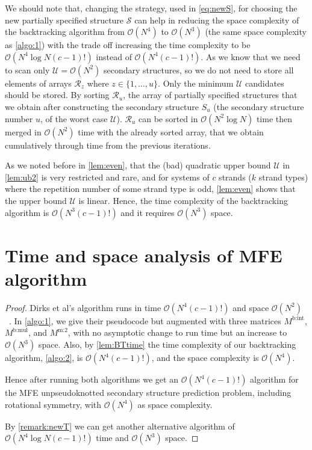 \begin{remark}\label{remark:newT}
	We should note that, changing the strategy, used in \cref{eq:newS}, for choosing the new partially specified structure $\mathcal{S}$ can help in reducing the space complexity of the backtracking algorithm from $\mathcal{O}(N^4)$ to $\mathcal{O}(N^3)$ (the same space complexity as \snMFE \cref{algo:1}) with the trade off increasing the time complexity to be $\mathcal{O}(N^4 \log N(c-1)!)$ instead of $\mathcal{O}(N^4 (c-1)!)$. As we know that we need to scan only $\mathcal{U} = \mathcal{O}(N^2)$ secondary structures, so we do not need to store all elements of arrays $\mathcal{R}_z$ where $z \in \{1,\ldots,u\}$. 
	Only the minimum $\mathcal{U}$ candidates should be stored. By sorting $\mathcal{R}_u$, the array of partially specified structures that we obtain after constructing the secondary structure $S_u$ (the secondary structure number $u$, of the worst case $\mathcal{U}$). $\mathcal{R}_u$ can be sorted in $\mathcal{O}(N^2 \log N)$ time then merged in $\mathcal{O}(N^2)$ time with the already sorted array, that we obtain cumulatively through time from the previous iterations.        
\end{remark} 

As we noted before in \cref{lem:even}, that the (bad) quadratic upper bound $\mathcal{U}$ in \cref{lem:ub2} is very restricted and rare, and 
for systems of $c$ strands ($k$ strand types) where the repetition number of some strand type is odd, \cref{lem:even} shows that the upper bound $\mathcal{U}$ is linear. Hence, the time complexity of the backtracking algorithm is $\mathcal{O}(N^3(c-1)!)$ and it requires $\mathcal{O}(N^3)$ space.




\section{Time and space analysis of MFE algorithm}\label{sec:analysis}

\main*


\begin{proof}
	Dirks et al's \snMFE algorithm runs in time $\mathcal{O}(N^4 (c-1)!)$ and space $\mathcal{O}(N^2)$~\cite{dirks2007thermodynamic}. 
	In \cref{algo:1}, we give their  \snMFE pseudocode but augmented with three  matrices $M^\text{b:int}$, $M^\text{b:mul}$, and $M^\text{m:2}$,  
	with no asymptotic change to run time but an increase to $\mathcal{O}(N^3)$ space. 
	Also, by \cref{lem:BTtime} the time complexity of our backtracking algorithm, \cref{algo:2}, is $\mathcal{O}(N^4 (c-1)!)$, and the space complexity is $\mathcal{O}(N^4)$.
	
	Hence after running both algorithms we get an 
	$\mathcal{O}(N^4 (c-1)!)$ algorithm for the 
	MFE unpseudoknotted secondary structure prediction problem, including rotational symmetry, with  $\mathcal{O}(N^4)$ as space complexity.
	
	By \cref{remark:newT} we can get another alternative algorithm of  $\mathcal{O}(N^4 \log N(c-1)!)$ time and $\mathcal{O}(N^3)$ space. 
\end{proof}

